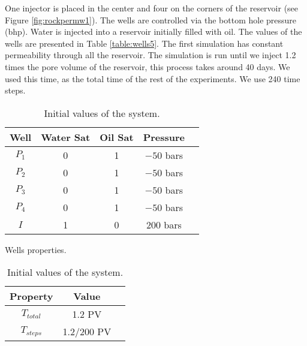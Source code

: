 \documentclass[12pt]{article}
\begin{document}
One injector is placed in the center and four on the corners of the reservoir (see Figure \ref{fig:rockpermw1}). The wells are controlled via the bottom hole pressure (bhp). 
 Water is injected into a reservoir initially filled with oil. The values of the wells are presented in Table \ref{table:wells5}. The first simulation has constant permeability through all the reservoir. The simulation is run until we inject 1.2 times the pore volume of the reservoir, this process takes around 40 days. We used this time, as the total time of the rest of the experiments. We use 240 time steps.    
\begin{table}[!ht]
\hspace{-0cm}
\begin{minipage}{.5\textwidth}
\centering
\begin{tabular}{ |c|c|c|c|c|} 
\hline
Well&Water Sat&Oil Sat&Pressure\\
\hline
$P_1$&     0&    1 & $-50$ bars \\  
$P_2$& 0& 1& $-50$ bars\\
$P_3$&     0&    1 & $-50$ bars \\  
$P_4$& 0& 1& $-50$ bars\\
$I$&     1&    0 & $200$ bars\\  
\hline
\end{tabular}
\caption{Wells properties.}\label{table:wells5}
\end{minipage}%
\begin{minipage}{.4\textwidth}
\centering
\begin{tabular}{ |c|c|c|} 
\hline
Property&Value\\
\hline
    $T_{total}$&     1.2 PV\\
$T_{steps}$& 1.2/200 PV\\
\hline
\end{tabular}\caption{Initial values of the system.}
\label{table:icw}
\end{minipage}
\hspace{1cm} 
\end{table} 
\end{document}
